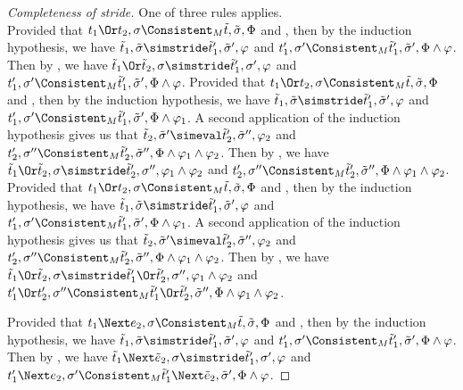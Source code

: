 \begin{proof}[Completeness of stride]
  {
  One of three rules applies.\\
   {
   Provided that $t_1\Or t_2,\sigma\Consistent_M \tilde{t},\tilde{\sigma},\Phi$ and ,
   then by the induction hypothesis, we have $\tilde{t}_1,\tilde{\sigma}\simstride\tilde{t}_1',\tilde{\sigma}',\phi$
   and $t_1',\sigma'\Consistent_M\tilde{t}_1',\tilde{\sigma}',\Phi\land\phi$.
   Then by , we have $\tilde{t}_1\Or\tilde{t}_2,\sigma\simstride\tilde{t}_1',\sigma',\phi$
   and $t_1',\sigma'\Consistent_M\tilde{t}_1',\tilde{\sigma}',\Phi\land\phi$.
  }
   {
   Provided that $t_1\Or t_2,\sigma\Consistent_M \tilde{t},\tilde{\sigma},\Phi$ and ,
   then by the induction hypothesis, we have $\tilde{t}_1,\tilde{\sigma}\simstride\tilde{t}_1',\tilde{\sigma}',\phi$
   and $t_1',\sigma'\Consistent_M\tilde{t}_1',\tilde{\sigma}',\Phi\land\phi_1$.
   A second application of the induction hypothesis gives us that $\tilde{t}_2,\tilde{\sigma}'\simeval \tilde{t}_2',\tilde{\sigma}'',\phi_2$
   and $t_2',\sigma''\Consistent_M\tilde{t}_2',\tilde{\sigma}'',\Phi\land\phi_1\land\phi_2$.
   Then by , we have $\tilde{t}_1\Or\tilde{t}_2,\sigma\simstride\tilde{t}_2',\sigma'',\phi_1\land\phi_2$
   and $t_2',\sigma''\Consistent_M\tilde{t}_2',\tilde{\sigma}'',\Phi\land\phi_1\land\phi_2$.
   }
  {
  Provided that $t_1\Or t_2,\sigma\Consistent_M \tilde{t},\tilde{\sigma},\Phi$ and ,
  then by the induction hypothesis, we have $\tilde{t}_1,\tilde{\sigma}\simstride\tilde{t}_1',\tilde{\sigma}',\phi$
  and $t_1',\sigma'\Consistent_M\tilde{t}_1',\tilde{\sigma}',\Phi\land\phi_1$.
  A second application of the induction hypothesis gives us that $\tilde{t}_2,\tilde{\sigma}'\simeval \tilde{t}_2',\tilde{\sigma}'',\phi_2$
  and $t_2',\sigma''\Consistent_M\tilde{t}_2',\tilde{\sigma}'',\Phi\land\phi_1\land\phi_2$.
  Then by , we have $\tilde{t}_1\Or\tilde{t}_2,\sigma\simstride\tilde{t}_1'\Or\tilde{t}_2',\sigma'',\phi_1\land\phi_2$
  and $t_1'\Or t_2',\sigma''\Consistent_M\tilde{t}_1'\Or \tilde{t}_2',\tilde{\sigma}'',\Phi\land\phi_1\land\phi_2$.
   }
  }

  {

  Provided that $t_1\Next e_2,\sigma\Consistent_M \tilde{t},\tilde{\sigma},\Phi$ and ,
  then by the induction hypothesis, we have $\tilde{t}_1,\tilde{\sigma}\simstride\tilde{t}_1',\tilde{\sigma}',\phi$
  and $t_1',\sigma'\Consistent_M\tilde{t}_1',\tilde{\sigma}',\Phi\land\phi$.
  Then by , we have $\tilde{t}_1\Next\tilde{e}_2,\sigma\simstride\tilde{t}_1',\sigma',\phi$
  and $t_1'\Next e_2,\sigma'\Consistent_M\tilde{t}_1'\Next \tilde{e}_2,\tilde{\sigma}',\Phi\land\phi$.
  }


\end{proof}

